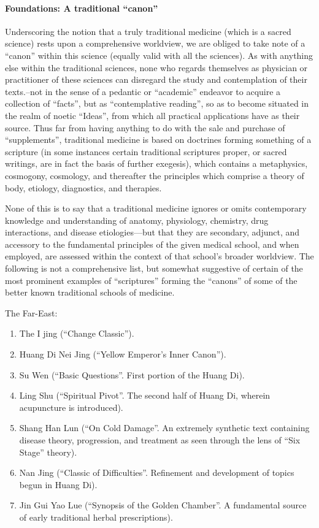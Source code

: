 \paragraph{Foundations: A traditional ``canon''}


Underscoring the notion that a truly traditional medicine (which is a sacred science) rests upon a comprehensive worldview, we are obliged to take note of a ``canon'' within this science (equally valid with all the sciences). As with anything else within the traditional sciences, none who regards themselves as physician or practitioner of these sciences can disregard the study and contemplation of their texts.--not in the sense of a pedantic or ``academic'' endeavor to acquire a collection of ``facts'', but as ``contemplative reading'', so as to become situated in the realm of noetic ``Ideas'', from which all practical applications have as their source. Thus far from having anything to do with the sale and purchase of ``supplements'', traditional medicine is based on doctrines forming something of a scripture (in some instances certain traditional scriptures proper, or sacred writings, are in fact the basis of further exegesis), which contains a metaphysics, cosmogony, cosmology, and thereafter the principles which comprise a theory of body, etiology, diagnostics, and therapies.

None of this is to say that a traditional medicine ignores or omits contemporary knowledge and understanding of anatomy, physiology, chemistry, drug interactions, and disease etiologies---but that they are secondary, adjunct, and accessory to the fundamental principles of the given medical school, and when employed, are assessed within the context of that school's broader worldview. The following is not a comprehensive list, but somewhat suggestive of certain of the most prominent examples of ``scriptures'' forming the ``canons'' of some of the better known traditional schools of medicine.

The Far-East:
\begin{enumerate}
\item The I jing (``Change Classic'').

\item Huang Di Nei Jing (``Yellow Emperor's Inner Canon'').

\item Su Wen (``Basic Questions''. First portion of the Huang Di).

\item Ling Shu (``Spiritual Pivot''. The second half of Huang Di, wherein acupuncture is introduced).

\item Shang Han Lun (``On Cold Damage''. An extremely synthetic text containing disease theory, progression, and treatment as seen through the lens of ``Six Stage'' theory).

\item Nan Jing (``Classic of Difficulties''. Refinement and development of topics begun in Huang Di).

\item Jin Gui Yao Lue (``Synopsis of the Golden Chamber''. A fundamental source of early traditional herbal prescriptions).
\end{enumerate}

